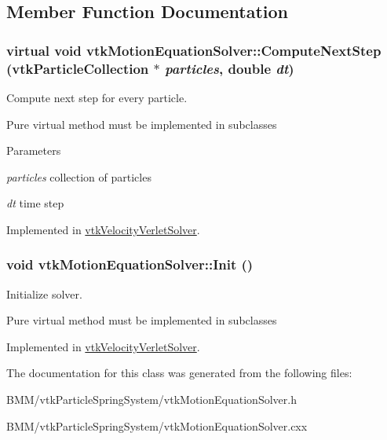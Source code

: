\subsection{Member Function Documentation}
\hypertarget{classvtkMotionEquationSolver_a1b355adf0c7ce01e51d91fd499f0c15b}{
\subsubsection[{ComputeNextStep}]{\setlength{\rightskip}{0pt plus 5cm}virtual void vtkMotionEquationSolver::ComputeNextStep ({\bf vtkParticleCollection} $\ast$ {\em particles}, \/  double {\em dt})}}
\label{classvtkMotionEquationSolver_a1b355adf0c7ce01e51d91fd499f0c15b}


Compute next step for every particle. 

Pure virtual method must be implemented in subclasses 
\begin{DoxyParams}{Parameters}
\item[{\em particles}]collection of particles \item[{\em dt}]time step \end{DoxyParams}


Implemented in \hyperlink{classvtkVelocityVerletSolver_af9c28e67adeab24a3d24e73daa2e40dd}{vtkVelocityVerletSolver}.

\hypertarget{classvtkMotionEquationSolver_a32129d91bbd906d394f40626c0772d15}{
\subsubsection[{Init}]{\setlength{\rightskip}{0pt plus 5cm}void vtkMotionEquationSolver::Init ()}}
\label{classvtkMotionEquationSolver_a32129d91bbd906d394f40626c0772d15}


Initialize solver. 

Pure virtual method must be implemented in subclasses 

Implemented in \hyperlink{classvtkVelocityVerletSolver_aceb81c517b082ed4b67aaf495d043553}{vtkVelocityVerletSolver}.



The documentation for this class was generated from the following files:\begin{DoxyCompactItemize}
\item 
BMM/vtkParticleSpringSystem/vtkMotionEquationSolver.h\item 
BMM/vtkParticleSpringSystem/vtkMotionEquationSolver.cxx\end{DoxyCompactItemize}
